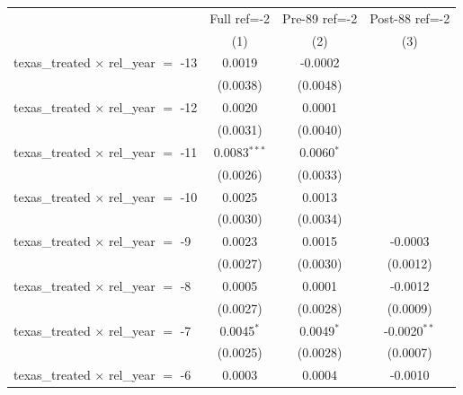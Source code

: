 
\begingroup
\centering
\begin{tabular}{lccc}
   \toprule
                                                & Full ref=-2           & Pre-89 ref=-2          & Post-88 ref=-2 \\   
                                                & (1)                   & (2)                    & (3)\\  
   \midrule 
   texas\_treated $\times$ rel\_year $=$ -13    & 0.0019                & -0.0002                &   \\   
                                                & (0.0038)              & (0.0048)               &   \\   
   texas\_treated $\times$ rel\_year $=$ -12    & 0.0020                & 0.0001                 &   \\   
                                                & (0.0031)              & (0.0040)               &   \\   
   texas\_treated $\times$ rel\_year $=$ -11    & 0.0083$^{***}$        & 0.0060$^{*}$           &   \\   
                                                & (0.0026)              & (0.0033)               &   \\   
   texas\_treated $\times$ rel\_year $=$ -10    & 0.0025                & 0.0013                 &   \\   
                                                & (0.0030)              & (0.0034)               &   \\   
   texas\_treated $\times$ rel\_year $=$ -9     & 0.0023                & 0.0015                 & -0.0003\\   
                                                & (0.0027)              & (0.0030)               & (0.0012)\\   
   texas\_treated $\times$ rel\_year $=$ -8     & 0.0005                & 0.0001                 & -0.0012\\   
                                                & (0.0027)              & (0.0028)               & (0.0009)\\   
   texas\_treated $\times$ rel\_year $=$ -7     & 0.0045$^{*}$          & 0.0049$^{*}$           & -0.0020$^{**}$\\   
                                                & (0.0025)              & (0.0028)               & (0.0007)\\   
   texas\_treated $\times$ rel\_year $=$ -6     & 0.0003                & 0.0004                 & -0.0010\\   

\end{tabular}
